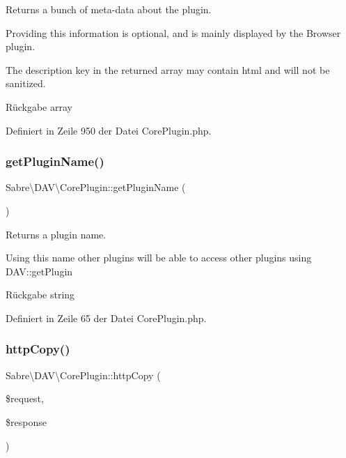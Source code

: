 Returns a bunch of meta-\/data about the plugin.

Providing this information is optional, and is mainly displayed by the Browser plugin.

The description key in the returned array may contain html and will not be sanitized.

\begin{DoxyReturn}{Rückgabe}
array 
\end{DoxyReturn}


Definiert in Zeile 950 der Datei Core\+Plugin.\+php.

\mbox{\label{class_sabre_1_1_d_a_v_1_1_core_plugin_a8f1937736320fe94cf5403287f2fb6bf}} 
\subsubsection{\texorpdfstring{get\+Plugin\+Name()}{getPluginName()}}
{\footnotesize\ttfamily Sabre\textbackslash{}\+D\+A\+V\textbackslash{}\+Core\+Plugin\+::get\+Plugin\+Name (\begin{DoxyParamCaption}{ }\end{DoxyParamCaption})}

Returns a plugin name.

Using this name other plugins will be able to access other plugins using D\+AV\+::get\+Plugin

\begin{DoxyReturn}{Rückgabe}
string 
\end{DoxyReturn}


Definiert in Zeile 65 der Datei Core\+Plugin.\+php.

\mbox{\label{class_sabre_1_1_d_a_v_1_1_core_plugin_a0eed50d5ee6f742f0a9be9f6494b5d32}} 
\subsubsection{\texorpdfstring{http\+Copy()}{httpCopy()}}
{\footnotesize\ttfamily Sabre\textbackslash{}\+D\+A\+V\textbackslash{}\+Core\+Plugin\+::http\+Copy (\begin{DoxyParamCaption}\item[{\mbox{\hyperlink{interface_sabre_1_1_h_t_t_p_1_1_request_interface}{Request\+Interface}}}]{\$request,  }\item[{\mbox{\hyperlink{interface_sabre_1_1_h_t_t_p_1_1_response_interface}{Response\+Interface}}}]{\$response }\end{DoxyParamCaption})}

